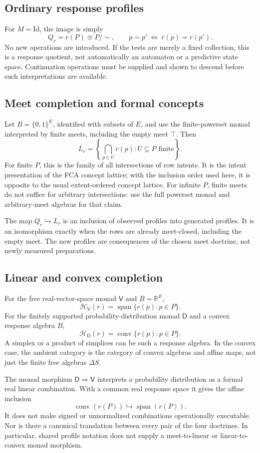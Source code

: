 \documentclass[11pt]{article}
\DeclareMathOperator{\conv}{conv}
\DeclareMathOperator{\spanlin}{span}
\newcommand{\RR}{\mathbb R}
\newcommand{\HH}{\mathcal H}
\newcommand{\DD}{\mathsf D}
\newcommand{\VV}{\mathsf V}
\begin{document}
\subsection{Ordinary response profiles}
For $M=\mathrm{Id}$, the image is simply
\[
 Q_r=r(P)\cong P/{\sim},\qquad p\sim p'\ \Longleftrightarrow\ r(p)=r(p').
\]
No new operations are introduced. If the tests are merely a fixed collection, this is a response quotient, not automatically an automaton or a predictive state space. Continuation operations must be supplied and shown to descend before such interpretations are available.

\subsection{Meet completion and formal concepts}
Let $B=\{0,1\}^E$, identified with subsets of $E$, and use the finite-powerset monad interpreted by finite meets, including the empty meet $\top$. Then
\[
 L_r=\left\{\bigcap_{p\in U}r(p):U\subseteq P\text{ finite}\right\}.
\]
For finite $P$, this is the family of all intersections of row intents. It is the intent presentation of the FCA concept lattice; with the inclusion order used here, it is opposite to the usual extent-ordered concept lattice. For infinite $P$, finite meets do not suffice for arbitrary intersections: use the full powerset monad and arbitrary-meet algebras for that claim.

The map $Q_r\hookrightarrow L_r$ is an inclusion of observed profiles into generated profiles. It is an isomorphism exactly when the rows are already meet-closed, including the empty meet. The new profiles are consequences of the chosen meet doctrine, not newly measured preparations.

\subsection{Linear and convex completion}
For the free real-vector-space monad $\VV$ and $B=\RR^E$,
\[
 \HH_{\VV}(r)=\spanlin\{r(p):p\in P\}.
\]
For the finitely supported probability-distribution monad $\DD$ and a convex response algebra $B$,
\[
 \HH_{\DD}(r)=\conv\{r(p):p\in P\}.
\]
A simplex or a product of simplices can be such a response algebra. In the convex case, the ambient category is the category of convex algebras and affine maps, not just the finite free algebras $\Delta S$.

The monad morphism $\DD\Rightarrow\VV$ interprets a probability distribution as a formal real linear combination. With a common real response space it gives the affine inclusion
\[
 \conv(r(P))\hookrightarrow\spanlin(r(P)).
\]
It does not make signed or unnormalized combinations operationally executable. Nor is there a canonical translation between every pair of the four doctrines. In particular, shared profile notation does not supply a meet-to-linear or linear-to-convex monad morphism.
\end{document}
